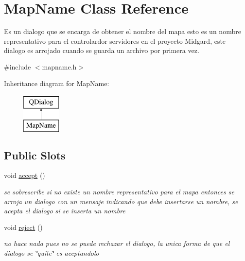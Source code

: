 \hypertarget{class_map_name}{\section{Map\-Name Class Reference}
\label{class_map_name}
}


Es un dialogo que se encarga de obtener el nombre del mapa esto es un nombre representativo para el controlardor servidores en el proyecto Midgard, este dialogo es arrojado cuando se guarda un archivo por primera vez.  




{\ttfamily \#include $<$mapname.\-h$>$}

Inheritance diagram for Map\-Name\-:\begin{figure}[H]
\begin{center}
\leavevmode
\includegraphics[height=2.000000cm]{class_map_name}
\end{center}
\end{figure}
\subsection*{Public Slots}
\begin{DoxyCompactItemize}
\item 
\hypertarget{class_map_name_a2d10ccd3853afeb9f30c2336eb138e04}{void \hyperlink{class_map_name_a2d10ccd3853afeb9f30c2336eb138e04}{accept} ()}\label{class_map_name_a2d10ccd3853afeb9f30c2336eb138e04}

\begin{DoxyCompactList}\small\item\em se sobrescribe si no existe un nombre representativo para el mapa entonces se arroja un dialogo con un mensaje indicando que debe insertarse un nombre, se acepta el dialogo si se inserta un nombre \end{DoxyCompactList}\item 
\hypertarget{class_map_name_afaa02200b9a312c6b7865fc19e6ec52f}{void \hyperlink{class_map_name_afaa02200b9a312c6b7865fc19e6ec52f}{reject} ()}\label{class_map_name_afaa02200b9a312c6b7865fc19e6ec52f}

\begin{DoxyCompactList}\small\item\em no hace nada pues no se puede rechazar el dialogo, la unica forma de que el dialogo se \char`\"{}quite\char`\"{} es aceptandolo \end{DoxyCompactList}\end{DoxyCompactItemize}

